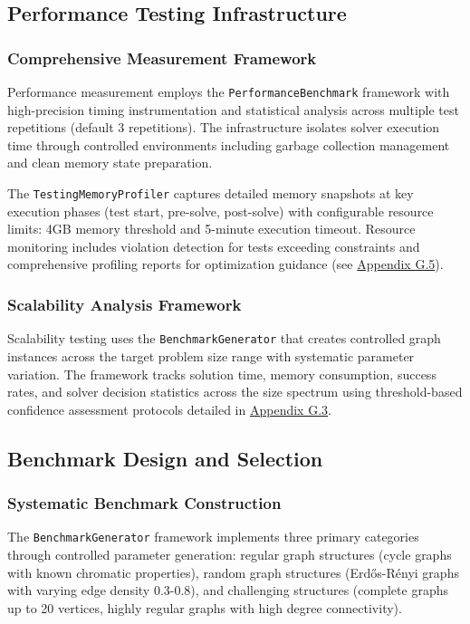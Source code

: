 \subsection{Performance Testing Infrastructure}

\subsubsection{Comprehensive Measurement Framework}
\label{sec:timing-measurement}
Performance measurement employs the \texttt{PerformanceBenchmark} framework with high-precision timing instrumentation and statistical analysis across multiple test repetitions (default 3 repetitions). The infrastructure isolates solver execution time through controlled environments including garbage collection management and clean memory state preparation.

The \texttt{TestingMemoryProfiler} captures detailed memory snapshots at key execution phases (test start, pre-solve, post-solve) with configurable resource limits: 4GB memory threshold and 5-minute execution timeout. Resource monitoring includes violation detection for tests exceeding constraints and comprehensive profiling reports for optimization guidance (see \hyperref[appendix:memory-profiling-testing]{Appendix G.5}).

\subsubsection{Scalability Analysis Framework}
\label{sec:scalability-analysis}
Scalability testing uses the \texttt{BenchmarkGenerator} that creates controlled graph instances across the target problem size range with systematic parameter variation. The framework tracks solution time, memory consumption, success rates, and solver decision statistics across the size spectrum using threshold-based confidence assessment protocols detailed in \hyperref[appendix:performance-measurement]{Appendix G.3}.

\subsection{Benchmark Design and Selection}

\subsubsection{Systematic Benchmark Construction}
The \texttt{BenchmarkGenerator} framework implements three primary categories through controlled parameter generation: regular graph structures (cycle graphs with known chromatic properties), random graph structures (Erdős-Rényi graphs with varying edge density 0.3-0.8), and challenging structures (complete graphs up to 20 vertices, highly regular graphs with high degree connectivity).

